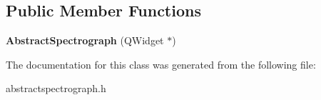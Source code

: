 \subsection*{Public Member Functions}
\begin{DoxyCompactItemize}
\item 
\hypertarget{class_abstract_spectrograph_a623904d57582b553e0c15005a3690fd0}{{\bfseries Abstract\-Spectrograph} (Q\-Widget $\ast$)}\label{class_abstract_spectrograph_a623904d57582b553e0c15005a3690fd0}

\end{DoxyCompactItemize}


The documentation for this class was generated from the following file\-:\begin{DoxyCompactItemize}
\item 
abstractspectrograph.\-h\end{DoxyCompactItemize}
